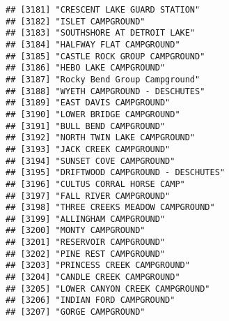 \documentclass[
]{article}
\begin{document}
\begin{verbatim}
## [3181] "CRESCENT LAKE GUARD STATION"                                                         
## [3182] "ISLET CAMPGROUND"                                                                    
## [3183] "SOUTHSHORE AT DETROIT LAKE"                                                          
## [3184] "HALFWAY FLAT CAMPGROUND"                                                             
## [3185] "CASTLE ROCK GROUP CAMPGROUND"                                                        
## [3186] "HEBO LAKE CAMPGROUND"                                                                
## [3187] "Rocky Bend Group Campground"                                                         
## [3188] "WYETH CAMPGROUND - DESCHUTES"                                                        
## [3189] "EAST DAVIS CAMPGROUND"                                                               
## [3190] "LOWER BRIDGE CAMPGROUND"                                                             
## [3191] "BULL BEND CAMPGROUND"                                                                
## [3192] "NORTH TWIN LAKE CAMPGROUND"                                                          
## [3193] "JACK CREEK CAMPGROUND"                                                               
## [3194] "SUNSET COVE CAMPGROUND"                                                              
## [3195] "DRIFTWOOD CAMPGROUND - DESCHUTES"                                                    
## [3196] "CULTUS CORRAL HORSE CAMP"                                                            
## [3197] "FALL RIVER CAMPGROUND"                                                               
## [3198] "THREE CREEKS MEADOW CAMPGROUND"                                                      
## [3199] "ALLINGHAM CAMPGROUND"                                                                
## [3200] "MONTY CAMPGROUND"                                                                    
## [3201] "RESERVOIR CAMPGROUND"                                                                
## [3202] "PINE REST CAMPGROUND"                                                                
## [3203] "PRINCESS CREEK CAMPGROUND"                                                           
## [3204] "CANDLE CREEK CAMPGROUND"                                                             
## [3205] "LOWER CANYON CREEK CAMPGROUND"                                                       
## [3206] "INDIAN FORD CAMPGROUND"                                                              
## [3207] "GORGE CAMPGROUND"                                                                    

\end{verbatim}
\end{document}
